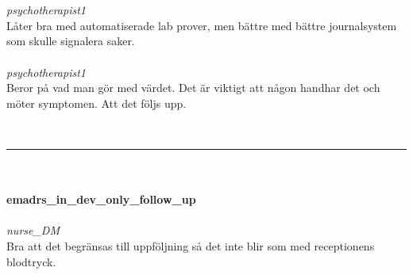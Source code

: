 \documentclass[12pt,a4paper,oneside]{article}
\begin{document}
\ \\\ \\
 { \it   psychotherapist1 %
}\\ 
L{\aa}ter bra med automatiserade lab prover, men b{\"a}ttre med b{\"a}ttre journalsystem som skulle signalera saker. %
\ \\\ \\
 { \it   psychotherapist1 %
}\\ 
Beror p{\aa} vad man g{\"o}r med v{\"a}rdet. Det {\"a}r viktigt att n{\aa}gon handhar det och m{\"o}ter symptomen. Att det f{\"o}ljs upp. %


\ \vspace{.66em}\\
\hrule
\ \vspace{.33em}\\
\ \\{\bf emadrs\_in\_dev\_only\_follow\_up }
\\\ \\%
 { \it \it nurse\_DM %
}\\ 
Bra att det begr{\"a}nsas till uppf{\"o}ljning s{\aa} det inte blir som med receptionens blodtryck. %
\end{document}
